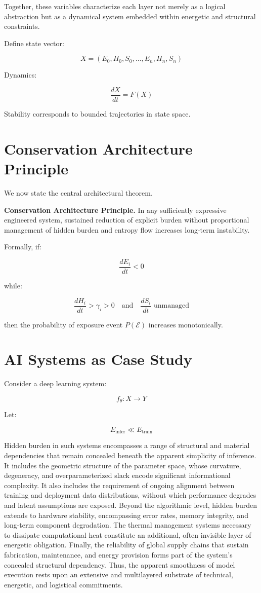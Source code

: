 \documentclass[11pt,openany]{book}
\begin{document}
Together, these variables characterize each layer not merely as a logical abstraction 
but as a dynamical system embedded within energetic and structural constraints.


Define state vector:

\[
X = (E_0, H_0, S_0, \dots, E_n, H_n, S_n)
\]

Dynamics:

\[
\frac{dX}{dt} = F(X)
\]

Stability corresponds to bounded trajectories in state space.

\section{Conservation Architecture Principle}

We now state the central architectural theorem.

\medskip

\textbf{Conservation Architecture Principle.}
In any sufficiently expressive engineered system,
sustained reduction of explicit burden without proportional
management of hidden burden and entropy flow 
increases long-term instability.

\medskip

Formally, if:

\[
\frac{dE_i}{dt} < 0
\]

while:

\[
\frac{dH_i}{dt} > \gamma_i > 0
\quad \text{and} \quad
\frac{dS_i}{dt} \text{ unmanaged}
\]

then the probability of exposure event $P(\mathcal{E})$ increases monotonically.

\section{AI Systems as Case Study}

Consider a deep learning system:

\[
f_\theta : X \to Y
\]

Let:

\[
E_{\text{infer}} \ll E_{\text{train}}
\]

Hidden burden in such systems encompasses a range of structural and material dependencies that remain concealed beneath the apparent simplicity of inference. It includes the geometric structure of the parameter space, whose curvature, degeneracy, and overparameterized slack encode significant informational complexity. It also includes the requirement of ongoing alignment between training and deployment data distributions, without which performance degrades and latent assumptions are exposed. Beyond the algorithmic level, hidden burden extends to hardware stability, encompassing error rates, memory integrity, and long-term component degradation. The thermal management systems necessary to dissipate computational heat constitute an additional, often invisible layer of energetic obligation. Finally, the reliability of global supply chains that sustain fabrication, maintenance, and energy provision forms part of the system's concealed structural dependency. Thus, the apparent smoothness of model execution rests upon an extensive and multilayered substrate of technical, energetic, and logistical commitments. 
\end{document}
